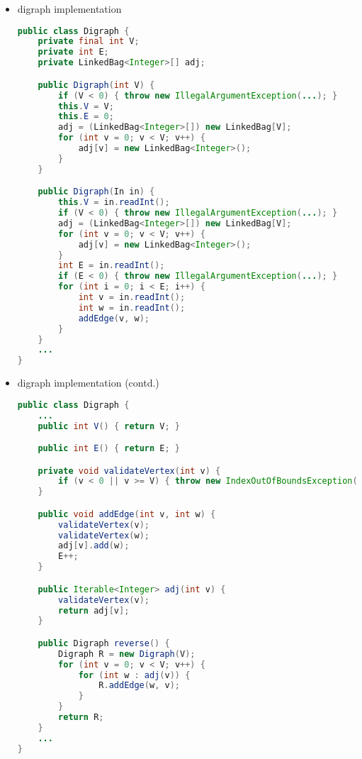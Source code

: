 \documentclass[8pt,a4paper,compress]{beamer}
\begin{document}
\begin{frame}[fragile]
\begin{itemize}
\item digraph implementation
\begin{lstlisting}[language=Java]
public class Digraph {
    private final int V;
    private int E;
    private LinkedBag<Integer>[] adj;

    public Digraph(int V) {
        if (V < 0) { throw new IllegalArgumentException(...); }
        this.V = V;
        this.E = 0;
        adj = (LinkedBag<Integer>[]) new LinkedBag[V];
        for (int v = 0; v < V; v++) {
            adj[v] = new LinkedBag<Integer>();
        }
    }

    public Digraph(In in) {
        this.V = in.readInt();
        if (V < 0) { throw new IllegalArgumentException(...); }
        adj = (LinkedBag<Integer>[]) new LinkedBag[V];
        for (int v = 0; v < V; v++) {
            adj[v] = new LinkedBag<Integer>();
        }
        int E = in.readInt();
        if (E < 0) { throw new IllegalArgumentException(...); }
        for (int i = 0; i < E; i++) {
            int v = in.readInt();
            int w = in.readInt();
            addEdge(v, w); 
        }
    }
    ...
}
\end{lstlisting}
\end{itemize}
\end{frame}

\begin{frame}[fragile]
\begin{itemize}
\item digraph implementation (contd.)
\begin{lstlisting}[language=Java]
public class Digraph {
    ...
    public int V() { return V; }

    public int E() { return E; }

    private void validateVertex(int v) {
        if (v < 0 || v >= V) { throw new IndexOutOfBoundsException(...); }
    }

    public void addEdge(int v, int w) {
        validateVertex(v);
        validateVertex(w);
        adj[v].add(w);
        E++;
    }

    public Iterable<Integer> adj(int v) {
        validateVertex(v);
        return adj[v];
    }

    public Digraph reverse() {
        Digraph R = new Digraph(V);
        for (int v = 0; v < V; v++) {
            for (int w : adj(v)) {
                R.addEdge(w, v);
            }
        }
        return R;
    }
    ...
}
\end{lstlisting}
\end{itemize}
\end{frame}
\end{document}
